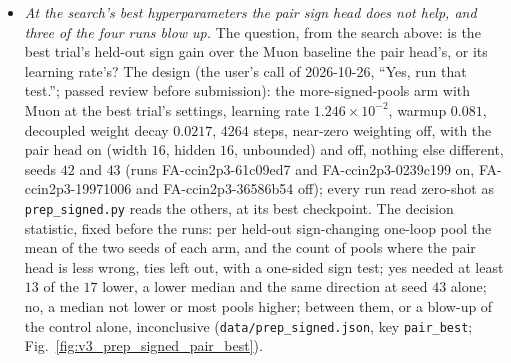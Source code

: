 \documentclass[11pt]{article}
\newcommand{\code}[1]{\texttt{#1}}
\begin{document}
\begin{itemize}
\begin{figure}[t]
{validation events) against the learning rate. (b) The objective over the magnitude loss against the learning
rate. (c) The wrong-sign share on the worst sign-changing training pool's validation events at the best checkpoint,
against the learning rate. (d) Per held-out sign-changing one-loop pool, the zero-shot wrong-sign share of the best
trial (the pair head's) and of the AdamW arm against the Muon baseline's; the line is equality.}\label{fig:v3_sign_head_search}
\end{figure}
  \item \emph{At the search's best hyperparameters the pair sign head does not help, and three of the four runs blow
    up.} The question, from the search above: is the best trial's held-out sign gain over the Muon baseline the pair
    head's, or its learning rate's? The design (the user's call of 2026-10-26, ``Yes, run that test.''; passed review
    before submission): the more-signed-pools arm with Muon at the best trial's settings, learning rate
    $1.246\times10^{-2}$, warmup $0.081$, decoupled weight decay $0.0217$, $4264$ steps, near-zero weighting off, with
    the pair head on (width $16$, hidden $16$, unbounded) and off, nothing else different, seeds $42$ and $43$ (runs
    FA-ccin2p3-61c09ed7 and FA-ccin2p3-0239c199 on, FA-ccin2p3-19971006 and FA-ccin2p3-36586b54 off); every run read
    zero-shot as \code{prep\_signed.py} reads the others, at its best checkpoint. The decision statistic, fixed before
    the runs: per held-out sign-changing one-loop pool the mean of the two seeds of each arm, and the count of pools
    where the pair head is less wrong, ties left out, with a one-sided sign test; yes needed at least $13$ of the $17$
    lower, a lower median and the same direction at seed $43$ alone; no, a median not lower or most pools higher;
    between them, or a blow-up of the control alone, inconclusive (\code{data/prep\_signed.json}, key
    \code{pair\_best}; Fig.~\ref{fig:v3_prep_signed_pair_best}).

\end{itemize}
\end{document}
